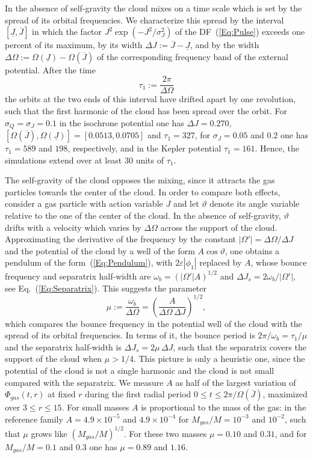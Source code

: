 In the absence of self-gravity the cloud mixes on a time scale which is set by the spread of its orbital frequencies. We characterize this spread by the interval $[\underline{J},\overline{J}]$ in which the factor $J^2\exp(-J^2/\sigma_J^2)$ of the DF~(\ref{Eq:Pulse}) exceeds one percent of its maximum, by its width $\Delta J := \overline{J} - \underline{J}$, and by the width $\Delta\Omega := \Omega(\underline{J}) - \Omega(\overline{J})$ of the corresponding frequency band of the external potential. After the time
\begin{equation}
\tau_1 := \frac{2\pi}{\Delta\Omega}
\label{Eq:tau1}
\end{equation}
the orbits at the two ends of this interval have drifted apart by one revolution, such that the first harmonic of the cloud has been spread over the orbit. For $\sigma_Q = \sigma_J = 0.1$ in the isochrone potential one has $\Delta J = 0.270$, $[\Omega(\overline{J}),\Omega(\underline{J})] = [0.0513,0.0705]$ and $\tau_1 = 327$, for $\sigma_J = 0.05$ and $0.2$ one has $\tau_1 = 589$ and $198$, respectively, and in the Kepler potential $\tau_1 = 161$. Hence, the simulations extend over at least $30$ units of $\tau_1$.

The self-gravity of the cloud opposes the mixing, since it attracts the gas particles towards the center of the cloud. In order to compare both effects, consider a gas particle with action variable $J$ and let $\vartheta$ denote its angle variable relative to the one of the center of the cloud. In the absence of self-gravity, $\vartheta$ drifts with a velocity which varies by $\Delta\Omega$ across the support of the cloud. Approximating the derivative of the frequency by the constant $|\Omega'| = \Delta\Omega/\Delta J$ and the potential of the cloud by a well of the form $A\cos\vartheta$, one obtains a pendulum of the form~(\ref{Eq:Pendulum}), with $2\varepsilon|\phi_1|$ replaced by $A$, whose bounce frequency and separatrix half-width are $\omega_b = (|\Omega'| A)^{1/2}$ and $\Delta J_s = 2\omega_b/|\Omega'|$, see Eq.~(\ref{Eq:Separatrix}). This suggests the parameter
\begin{equation}
\mu := \frac{\omega_b}{\Delta\Omega} = \left( \frac{A}{\Delta\Omega\,\Delta J} \right)^{1/2},
\label{Eq:muDef}
\end{equation}
which compares the bounce frequency in the potential well of the cloud with the spread of its orbital frequencies. In terms of it, the bounce period is $2\pi/\omega_b = \tau_1/\mu$ and the separatrix half-width is $\Delta J_s = 2\mu\,\Delta J$, such that the separatrix covers the support of the cloud when $\mu > 1/4$. This picture is only a heuristic one, since the potential of the cloud is not a single harmonic and the cloud is not small compared with the separatrix. We measure $A$ as half of the largest variation of $\Phi_{gas}(t,r)$ at fixed $r$ during the first radial period $0\leq t\leq 2\pi/\Omega(\overline{J})$, maximized over $3\leq r\leq 15$. For small masses $A$ is proportional to the mass of the gas: in the reference family $A = 4.9\times 10^{-5}$ and $4.9\times 10^{-4}$ for $M_{gas}/M = 10^{-3}$ and $10^{-2}$, such that $\mu$ grows like $(M_{gas}/M)^{1/2}$. For these two masses $\mu = 0.10$ and $0.31$, and for $M_{gas}/M = 0.1$ and $0.3$ one has $\mu = 0.89$ and $1.16$.


